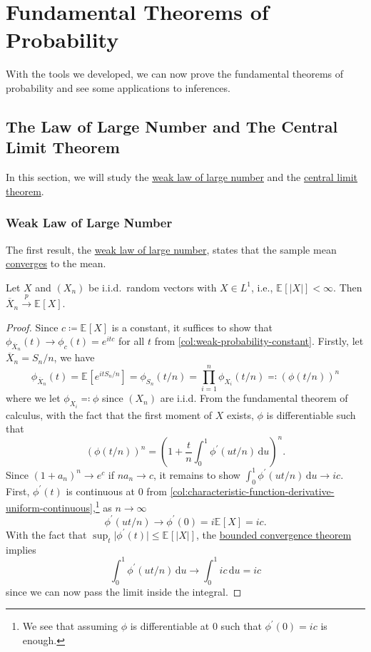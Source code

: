\chapter{Fundamental Theorems of Probability}
With the tools we developed, we can now prove the fundamental theorems of probability and see some applications to inferences.

\section{The Law of Large Number and The Central Limit Theorem}
In this section, we will study the \hyperref[thm:WLLN]{weak law of large number} and the \hyperref[thm:CLT]{central limit theorem}.

\subsection{Weak Law of Large Number}
The first result, the \hyperref[thm:WLLN]{weak law of large number}, states that the sample mean \hyperref[def:converge-in-probability]{converges} to the mean.

\begin{theorem}\label{thm:WLLN}
	Let \(X\) and \((X_n)\) be i.i.d.\ random vectors with \(X \in L^1\), i.e., \(\mathbb{E}_{}[\vert X \vert ] < \infty \). Then \(\overline{X} _n \overset{p}{\to } \mathbb{E}_{}[X] \).
\end{theorem}
\begin{proof}
	Since \(c \coloneqq \mathbb{E}_{}[X] \) is a constant, it suffices to show that \(\phi _{\overline{X} _n}(t) \to \phi _{c} (t) = e^{itc}\) for all \(t\) from \autoref{col:weak-probability-constant}. Firstly, let \(\overline{X} _n = S_n / n\), we have
	\[
		\phi _{\overline{X} _n}(t)
		= \mathbb{E}_{}[e^{it S_n / n}]
		= \phi _{S_n}(t / n)
		= \prod_{i=1}^{n} \phi _{X_i}(t / n)
		\eqqcolon \left( \phi (t / n) \right) ^n
	\]
	where we let \(\phi _{X_i} \eqqcolon \phi \) since \((X_n)\) are i.i.d. From the fundamental theorem of calculus, with the fact that the first moment of \(X\) exists, \(\phi \) is differentiable such that
	\[
		\left( \phi (t / n) \right) ^n
		= \left( 1 + \frac{t}{n} \int_{0}^{1} \phi ^{\prime} (u t / n) \,\mathrm{d}u  \right) ^n .
	\]
	Since \((1 + a_n)^n \to e^c\) if \(n a_n \to c\), it remains to show \(\int_{0}^{1} \phi ^{\prime} (u t / n) \,\mathrm{d}u \to ic\). First, \(\phi ^{\prime} (t)\) is continuous at \(0\) from \autoref{col:characteristic-function-derivative-uniform-continuous},\footnote{We see that assuming \(\phi \) is differentiable at \(0\) such that \(\phi ^{\prime} (0) = ic\) is enough.} as \(n \to \infty \)
	\[
		\phi ^{\prime} (u t / n) \to \phi ^{\prime} (0) = i \mathbb{E}_{}[X] = ic.
	\]
	With the fact that \(\sup _t \vert \phi ^{\prime} (t) \vert \leq \mathbb{E}_{}[\vert X \vert ] \), the \href{https://en.wikipedia.org/wiki/Dominated_convergence_theorem}{bounded convergence theorem} implies
	\[
		\int_{0}^{1} \phi ^{\prime} (ut / n) \,\mathrm{d}u
		\to \int_{0}^{1} ic \,\mathrm{d}u
		= ic
	\]
	since we can now pass the limit inside the integral.
\end{proof}

